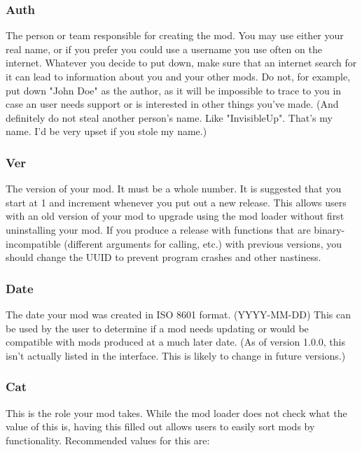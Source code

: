\documentclass[12pt,a4paper,notitlepage]{article}
\begin{document}
\subsubsection{Auth}
\label{subsubsec:create-meta-auth}
The person or team responsible for creating the mod. You may use either your real name, or if you prefer you could use a username you use often on the internet. Whatever you decide to put down, make sure that an internet search for it can lead to information about you and your other mods. Do not, for example, put down "John Doe" as the author, as it will be impossible to trace to you in case an user needs support or is interested in other things you've made. (And definitely do not steal another person's name. Like "InvisibleUp". That's my name. I'd be very upset if you stole my name.)

\subsubsection{Ver}
\label{subsubsec:create-meta-ver}
The version of your mod. It must be a whole number. It is suggested that you start at 1 and increment whenever you put out a new release. This allows users with an old version of your mod to upgrade using the mod loader without first uninstalling your mod. If you produce a release with functions that are binary-incompatible (different arguments for calling, etc.) with previous versions, you should change the UUID to prevent program crashes and other nastiness.

\subsubsection{Date}
\label{subsubsec:create-meta-date}
The date your mod was created in ISO 8601 format. (YYYY-MM-DD) This can be used by the user to determine if a mod needs updating or would be compatible with mods produced at a much later date. (As of version 1.0.0, this isn't actually listed in the interface. This is likely to change in future versions.)

\subsubsection{Cat}
\label{subsubsec:create-meta-cat}
This is the role your mod takes. While the mod loader does not check what the value of this is, having this filled out allows users to easily sort mods by functionality. Recommended values for this are:
\end{document}
